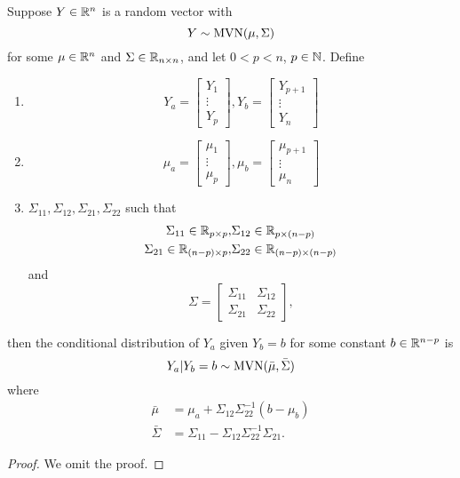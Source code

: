 \documentclass[11pt,fleqn]{book} %
\begin{document}
\begin{proposition} \label{prop:2111}
Suppose \(Y \in \mathbb{R}^n\) is a random vector with
\[
Y \sim \operatorname{MVN}(\mu, \Sigma)
\]
for some \(\mu \in \mathbb{R}^n\) and \(\Sigma \in \mathbb{R}_{n\times n}\), and let \(0 < p < n\), \(p \in \mathbb{N}\). Define
\begin{enumerate}
\item \[Y_a = \begin{bmatrix} Y_1 \\ \vdots \\ Y_p\end{bmatrix}, Y_b = \begin{bmatrix} Y_{p+1} \\ \vdots \\ Y_n\end{bmatrix}\]
\item \[\mu_a = \begin{bmatrix} \mu_1 \\ \vdots \\ \mu_p\end{bmatrix}, \mu_b = \begin{bmatrix} \mu_{p+1} \\ \vdots \\ \mu_n\end{bmatrix}\]
\item \(\Sigma_{11}, \Sigma_{12}, \Sigma_{21}, \Sigma_{22}\) such that
\[
\begin{aligned}
\Sigma_{11} \in \mathbb{R}_{p \times p}, &\Sigma_{12} \in \mathbb{R}_{p\times(n-p)} \\
\Sigma_{21} \in \mathbb{R}_{(n-p)\times p}, &\Sigma_{22}\in\mathbb{R}_{(n-p)\times(n-p)}
\end{aligned}
\]
and
\[
\Sigma = \begin{bmatrix} \Sigma_{11} & \Sigma_{12} \\
\Sigma_{21} & \Sigma_{22}
\end{bmatrix},
\]
\end{enumerate}
then the conditional distribution of \(Y_a\) given \(Y_b = b\) for some constant \(b \in \mathbb{R}^{n - p}\) is
\[
Y_a|Y_b = b \sim \operatorname{MVN}(\bar{\mu}, \bar{\Sigma})
\]
where
\[
\begin{aligned}
\bar{\mu} &= \mu_a + \Sigma_{12}\Sigma_{22}^{-1}(b - \mu_b) \\
\bar{\Sigma} &= \Sigma_{11} - \Sigma_{12}\Sigma_{22}^{-1}\Sigma_{21}.
\end{aligned}
\]
\end{proposition}
\begin{proof} We omit the proof.\end{proof}
\end{document}
